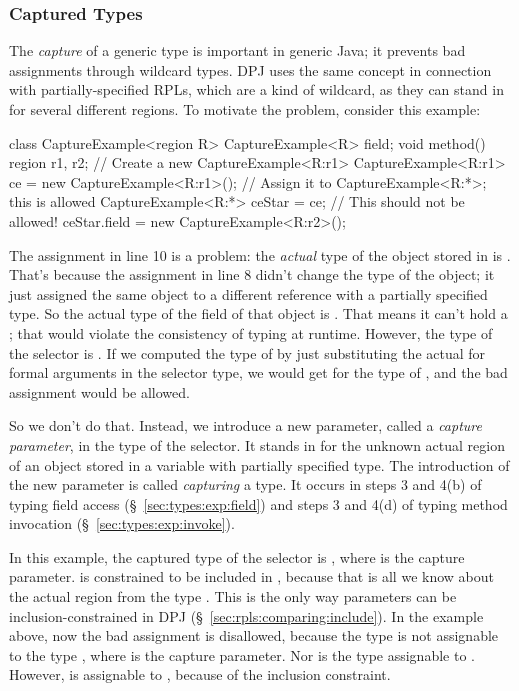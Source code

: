 \subsubsection{Captured Types%
\label{sec:types:exp:capture}}

The \emph{capture} of a generic type is important in generic Java; it
prevents bad assignments through wildcard types.  DPJ uses the same
concept in connection with partially-specified RPLs, which are a kind
of wildcard, as they can stand in for several different regions.  To
motivate the problem, consider this example:
%
\begin{numbereddpjlisting}
class CaptureExample<region R> {
    CaptureExample<R> field;
    void method() {
        region r1, r2;
        // Create a new CaptureExample<R:r1>
        CaptureExample<R:r1> ce = new CaptureExample<R:r1>();
        // Assign it to CaptureExample<R:*>; this is allowed
        CaptureExample<R:*> ceStar = ce;
        // This should not be allowed!
        ceStar.field = new CaptureExample<R:r2>();
    }
}
\end{numbereddpjlisting}
%
The assignment in line 10 is a problem: the \emph{actual} type of the
object stored in  is .  That's
because the assignment in line 8 didn't change the type of the object;
it just assigned the same object to a different reference with a
partially specified type.  So the actual type of the  field
of that object is .  That means it can't
hold a ; that would violate the consistency
of typing at runtime.  However, the type of the selector 
is .  If we computed the type of
 by just substituting the actual for formal
arguments in the selector type, we would get 
for the type of , and the bad assignment would be
allowed.

So we don't do that.  Instead, we introduce a new parameter, called a
\emph{capture parameter}, in the type of the selector.  It stands in
for the unknown actual region of an object stored in a variable with
partially specified type.  The introduction of the new parameter is
called \emph{capturing} a type.  It occurs in steps 3 and 4(b) of
typing field access (\S~\ref{sec:types:exp:field}) and steps 3 and
4(d) of typing method invocation (\S~\ref{sec:types:exp:invoke}).

In this example, the captured type of the selector is
, where  is the capture parameter.
 is constrained to be included in , because that is
all we know about the actual region from the type
.  This is the only way parameters can be
inclusion-constrained in DPJ (\S~\ref{sec:rpls:comparing:include}).
In the example above, now the bad assignment is disallowed, because
the type  is not assignable to the type
, where  is the capture parameter.  Nor
is the type  assignable to
.  However,  is
assignable to , because of the inclusion
constraint.

